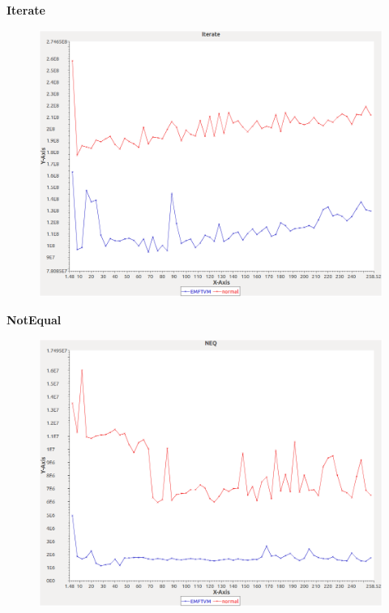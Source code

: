 \noindent\textbf{Iterate}

\begin{figure}[h]
\centering
\includegraphics[width=\textwidth]{../graphs/bag/Iterate}
\end{figure}
\pagebreak

\noindent\textbf{NotEqual}

\begin{figure}[h]
\centering
\includegraphics[width=\textwidth]{../graphs/bag/NEQ}
\end{figure}
\pagebreak

